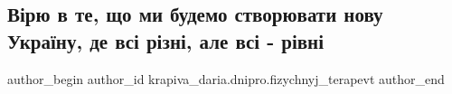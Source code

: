  
 
 
 
 

\subsection{Вірю в те, що ми будемо створювати нову Україну, де всі різні, але всі - рівні}
\label{sec:03_01_2023.fb.krapiva_daria.dnipro.fizychnyj_terapevt.1.v_ryu_v_te__shcho_mi}

\ifcmt
 author_begin
   author_id krapiva_daria.dnipro.fizychnyj_terapevt
 author_end
\fi
